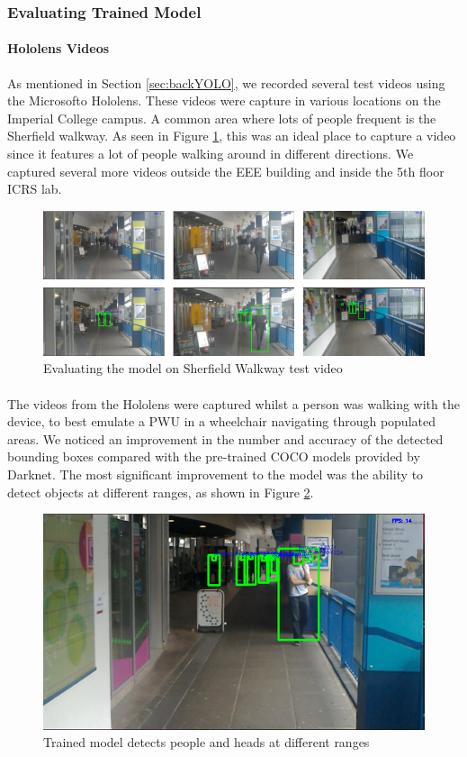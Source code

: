 \subsubsection{Evaluating Trained Model}
\paragraph{Hololens Videos} As mentioned in Section \ref{sec:backYOLO}, we recorded several test videos using the Microsofto Hololens. These videos were capture in various locations on the Imperial College campus. A common area where lots of people frequent is the Sherfield walkway. As seen in Figure \ref{fig:yoloSherfield}, this was an ideal place to capture a video since it features a lot of people walking around in different directions. We captured several more videos outside the EEE building and inside the 5th floor ICRS lab. 

\begin{figure}[ht]
	\centering
	\includegraphics[width=0.95\linewidth]{img/chapter5_implementation/yoloWalkwayMultiple.png}
	\caption{Evaluating the model on Sherfield Walkway test video}
	\label{fig:yoloSherfield}
\end{figure}

\paragraph{} The videos from the Hololens were captured whilst a person was walking with the device, to best emulate a PWU in a wheelchair navigating through populated areas. We noticed an improvement in the number and accuracy of the detected bounding boxes compared with the pre-trained COCO models provided by Darknet. The most significant improvement to the model was the ability to detect objects at different ranges, as shown in Figure \ref{fig:yoloRange}. 

\begin{figure}[ht]
	\centering
	\includegraphics[width=0.8\linewidth]{img/chapter5_implementation/yoloWalkway.png}
	\caption{Trained model detects people and heads at different ranges}
	\label{fig:yoloRange}
\end{figure}

